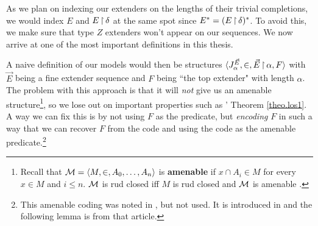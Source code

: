 As we plan on indexing our extenders on the lengths of their trivial completions, we would index $E$ and $E\operatorname{\upharpoonright}\delta$ at the same spot since $E^*=(E\operatorname{\upharpoonright}\delta)^*$. To avoid this, we make sure that type $Z$ extenders won't appear on our sequences. We now arrive at one of the most important definitions in this thesis.


A naive definition of our models would then be structures $\langle J_\alpha^{\vec E},\in,\vec E\operatorname{\upharpoonright}\alpha,F\rangle$ with $\vec E$ being a fine extender sequence and $F$ being ``the top extender" with length $\alpha$. The problem with this approach is that it will \textit{not} give us an amenable structure\footnote{Recall that $\operatorname{\mathcal{M}}=\langle M,\in,A_0,\hdots,A_n\rangle$ is \textbf{amenable} if $x\cap A_i\in M$ for every $x\in M$ and $i\leq n$. $\operatorname{\mathcal{M}}$ is rud closed iff $M$ is rud closed and $\operatorname{\mathcal{M}}$ is amenable \cite[Corollary 1.4]{Jensen}.}, so we lose out on important properties such as \los' Theorem \ref{theo.los1}. A way we can fix this is by not using $F$ as the predicate, but \textit{encoding} $F$ in such a way that we can recover $F$ from the code and using the code as the amenable predicate.\footnote{This amenable coding was noted in \cite{FSIT}, but not used. It is introduced in \cite{OIMT} and the following lemma is from that article.}

